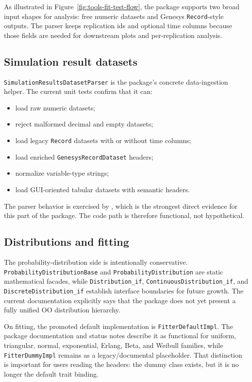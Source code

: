 As illustrated in Figure~\ref{fig:tools-fit-test-flow}, the package supports two broad input shapes for analysis: free numeric datasets and Genesys \texttt{Record}-style outputs. The parser keeps replication ids and optional time columns because those fields are needed for downstream plots and per-replication analysis.

\subsection{Simulation result datasets}
\label{subsec:tools-simulation-result-datasets}

\texttt{SimulationResultsDatasetParser} is the package's concrete data-ingestion helper. The current unit tests confirm that it can:
\begin{itemize}
\item load raw numeric datasets;
\item reject malformed decimal and empty datasets;
\item load legacy \texttt{Record} datasets with or without time columns;
\item load enriched \texttt{GenesysRecordDataset} headers;
\item normalize variable-type strings;
\item load GUI-oriented tabular datasets with semantic headers.
\end{itemize}

The parser behavior is exercised by , which is the strongest direct evidence for this part of the package. The code path is therefore functional, not hypothetical.

\subsection{Distributions and fitting}
\label{subsec:tools-distributions-and-fitting}

The probability-distribution side is intentionally conservative. \texttt{ProbabilityDistributionBase} and \texttt{ProbabilityDistribution} are static mathematical facades, while \texttt{Distribution\_if}, \texttt{ContinuousDistribution\_if}, and \texttt{DiscreteDistribution\_if} establish interface boundaries for future growth. The current documentation explicitly says that the package does not yet present a fully unified OO distribution hierarchy.

On fitting, the promoted default implementation is \texttt{FitterDefaultImpl}. The package documentation and status notes describe it as functional for uniform, triangular, normal, exponential, Erlang, Beta, and Weibull families, while \texttt{FitterDummyImpl} remains as a legacy/documental placeholder. That distinction is important for users reading the headers: the dummy class exists, but it is no longer the default trait binding.

